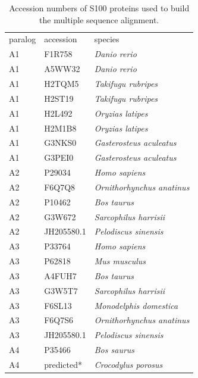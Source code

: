 \begin{table}[h!]\footnotesize
\centering
\caption[Accession numbers of S100 proteins
used to build the multiple sequence alignment] {Accession numbers of S100 proteins
used to build the multiple sequence alignment.}
\scriptsize
\begin{tabular}{lll}
{\footnotesize{}paralog} & {\footnotesize{}accession} & {\footnotesize{}species}\tabularnewline
{\footnotesize{}A1} & {\footnotesize{}F1R758} & \emph{\footnotesize{}Danio rerio}\tabularnewline
{\footnotesize{}A1} & {\footnotesize{}A5WW32} & \emph{\footnotesize{}Danio rerio}\tabularnewline
{\footnotesize{}A1} & {\footnotesize{}H2TQM5} & \emph{\footnotesize{}Takifugu rubripes}\tabularnewline
{\footnotesize{}A1} & {\footnotesize{}H2ST19} & \emph{\footnotesize{}Takifugu rubripes}\tabularnewline
{\footnotesize{}A1} & {\footnotesize{}H2L492} & \emph{\footnotesize{}Oryzias latipes}\tabularnewline
{\footnotesize{}A1} & {\footnotesize{}H2M1B8} & \emph{\footnotesize{}Oryzias latipes}\tabularnewline
{\footnotesize{}A1} & {\footnotesize{}G3NKS0} & \emph{\footnotesize{}Gasterosteus aculeatus}\tabularnewline
{\footnotesize{}A1} & {\footnotesize{}G3PEI0} & \emph{\footnotesize{}Gasterosteus aculeatus}\tabularnewline
{\footnotesize{}A2} & {\footnotesize{}P29034} & \emph{\footnotesize{}Homo sapiens}\tabularnewline
{\footnotesize{}A2} & {\footnotesize{}F6Q7Q8} & \emph{\footnotesize{}Ornithorhynchus anatinus }\tabularnewline
{\footnotesize{}A2} & {\footnotesize{}P10462} & \emph{\footnotesize{}Bos taurus}\tabularnewline
{\footnotesize{}A2} & {\footnotesize{}G3W672} & \emph{\footnotesize{}Sarcophilus harrisii}\tabularnewline
{\footnotesize{}A2} & {\footnotesize{}JH205580.1} & \emph{\footnotesize{}Pelodiscus sinensis}\tabularnewline
{\footnotesize{}A3} & {\footnotesize{}P33764} & \emph{\footnotesize{}Homo sapiens}\tabularnewline
{\footnotesize{}A3} & {\footnotesize{}P62818} & \emph{\footnotesize{}Mus musculus}\tabularnewline
{\footnotesize{}A3} & {\footnotesize{}A4FUH7} & \emph{\footnotesize{}Bos taurus}\tabularnewline
{\footnotesize{}A3} & {\footnotesize{}G3W5T7} & \emph{\footnotesize{}Sarcophilus harrisii}\tabularnewline
{\footnotesize{}A3} & {\footnotesize{}F6SL13} & \emph{\footnotesize{}Monodelphis domestica}\tabularnewline
{\footnotesize{}A3} & {\footnotesize{}F6Q7S6} & \emph{\footnotesize{}Ornithorhynchus anatinus}\tabularnewline
{\footnotesize{}A3} & {\footnotesize{}JH205580.1} & \emph{\footnotesize{}Pelodiscus sinensis}\tabularnewline
{\footnotesize{}A4} & {\footnotesize{}P35466} & \emph{\footnotesize{}Bos saurus}\tabularnewline
{\footnotesize{}A4} & {\footnotesize{}predicted{*}} & \emph{\footnotesize{}Crocodylus porosus}\tabularnewline

\end{tabular}
\end{table}
